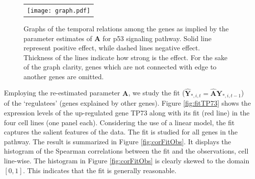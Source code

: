 \documentclass[a4paper]{article}
\begin{document}
\begin{figure}[h!]
\centering
\begin{tabular}{c}
\texttt{[image: graph.pdf]}\\
\end{tabular}
\caption{Graphs of the temporal relations among the genes as implied by the parameter estimates of $\mathbf{A}$ for p53 signaling pathway.
Solid line represent positive effect, while dashed lines negative effect. Thickness of the lines indicate how strong is the effect. For the sake of the graph clarity, genes which are not connected with edge to another genes are omitted.
}
\label{fig:graph}
\end{figure}

Employing the re-estimated parameter $\mathbf{A}$, we study the fit ($\hat{\mathbf{Y}}_{\ast, i, t} = \hat{\mathbf{A}} \mathbf{Y}_{\ast, i, t-1}$) of the `regulatees' (genes explained by other genes). Figure \ref{fig:fitTP73} shows the expression levels of the up-regulated gene TP73 along with its fit (red line) in the four cell lines (one panel each). Considering the use of a linear model, the fit captures the salient features of the data. The fit is studied for all genes in the pathway. The result is summarized in Figure \ref{fig:corFitObs}. It displays the histogram of the Spearman correlations between the fit and the observations, cell line-wise. The histogram in Figure \ref{fig:corFitObs} is clearly skewed to the domain $[0,1]$. This indicates that the fit is generally reasonable.
\end{document}
